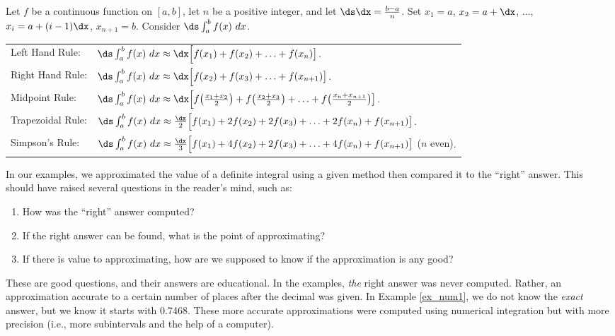 \setboxwidth{120pt}%
{Let $f$ be a continuous function on $[a,b]$, let $n$ be a positive integer, and let $\ds\dx = \frac{b-a}{n}$.
Set $x_1=a$, $x_2 = a+\dx$, $\ldots$, $x_i = a+(i-1)\dx$, $x_{n+1}=b$.
Consider $\ds\int_a^b f(x)\ dx$.\\
\begin{tabular}{ll}
Left Hand Rule: &
$\ds\int_a^b f(x)\ dx \approx \dx\Big[f(x_1) + f(x_2) + \ldots + f(x_n)\big]$.\\
Right Hand Rule: &
$\ds\int_a^b f(x)\ dx \approx \dx\Big[f(x_2) + f(x_3) + \ldots + f(x_{n+1})\big]$.\\
Midpoint Rule: &
$\ds\int_a^b f(x)\ dx \approx \dx\Big[f\big(\frac{x_1+x_2}2\big) + f\big(\frac{x_2+x_3}2\big) + \ldots + f\big(\frac{x_n+x_{n+1}}2\big)\big]$.\\
Trapezoidal Rule: &
$\ds\int_a^b f(x)\ dx \approx \frac{\dx}2\Big[f(x_1) + 2f(x_2) + 2f(x_3) +\ldots + 2f(x_n)+ f(x_{n+1})\big]$.\\
Simpson's Rule: &
$\ds\int_a^b f(x)\ dx \approx \frac{\dx}3\Big[f(x_1) + 4f(x_2) + 2f(x_3) +\ldots + 4f(x_n)+ f(x_{n+1})\big]$ {\small ($n$ even)}.
\end{tabular}}

In our examples, we approximated the value of a definite integral using a given method then compared it to the ``right'' answer. This should have raised several questions in the reader's mind, such as:
\begin{enumerate}
	\item	How was the ``right'' answer computed?
	\item	If the right answer can be found, what is the point of approximating?
	\item	If there is value to approximating, how are we supposed to know if the approximation is any good?
\end{enumerate}

These are good questions, and their answers are educational. In the examples, \textit{the} right answer was never computed. Rather, an approximation accurate to a certain number of places after the decimal was given. In Example \ref{ex_num1}, we do not know the \textit{exact} answer, but we know it starts with 0.7468. These more accurate approximations were computed using numerical integration but with more precision (i.e., more subintervals and the help of a computer). 

